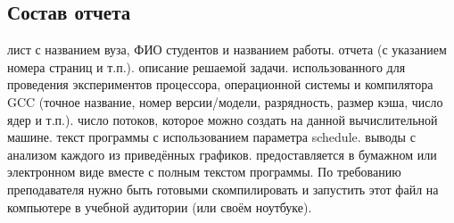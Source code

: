 \subsection{Состав отчета}
\begin{enumerate}
     лист с названием вуза, ФИО студентов и названием работы.
     отчета (с указанием номера страниц и т.п.).
     описание решаемой задачи.
     использованного для проведения экспериментов процессора, операционной системы и компилятора GCC (точное название, номер версии/модели, разрядность, размер кэша, число ядер и т.п.).
     число потоков, которое можно создать на данной вычислительной машине.
     текст программы с использованием параметра schedule.
     выводы с анализом каждого из приведённых графиков.
     предоставляется в бумажном или электронном виде вместе с полным текстом программы. По требованию преподавателя нужно быть готовыми скомпилировать и запустить этот файл на компьютере в учебной аудитории (или своём ноутбуке).
\end{enumerate}
